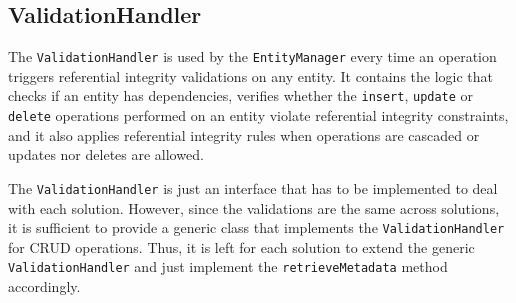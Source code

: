  		
		
		
		
		
		\subsection{ValidationHandler}\label{ss:VH}
		The \texttt{ValidationHandler} is used by the \texttt{EntityManager} every time
		an operation triggers  referential integrity validations on any entity.
		It contains the  logic that  checks  if an entity has dependencies,
		verifies whether the \texttt{insert}, \texttt{update} or
		\texttt{delete} operations performed on an entity  violate  referential
		integrity constraints, and it also applies referential integrity rules
		when operations are cascaded or updates nor deletes are allowed. 
		
		
		
		The \texttt{ValidationHandler} is just an interface that has to be implemented
		to deal with each solution. However, since the validations are the same across
		solutions, it is sufficient to provide a generic
		class that implements the \texttt{ValidationHandler} for \ac{CRUD} operations.
		Thus, it is left for each solution to extend the generic
		\texttt{ValidationHandler} and just implement the \texttt{retrieveMetadata}
		method accordingly.
		
		
		
		
	

